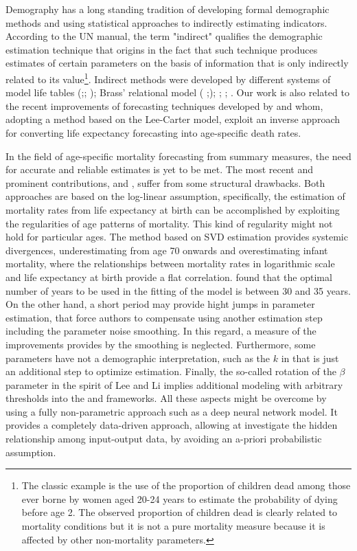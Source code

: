 \documentclass[a4,11pt]{article}
\begin{document}
Demography has a long standing tradition of developing formal demographic methods and using statistical approaches to indirectly estimating indicators. According to the UN manual, the term "indirect" qualifies the demographic estimation technique that origins in the fact that such technique produces estimates of certain parameters on the basis of information that is only indirectly related to its value\footnote{The classic example is the use of the proportion of children dead among those ever borne by women aged 20-24 years to estimate the probability of dying before age 2. The observed proportion of children dead is clearly related to mortality conditions but it is not a pure mortality measure because it is affected by other non-mortality parameters.}. 
Indirect methods were developed by different systems of model life tables (\cite{UN_1955};\cite{UN_1967}; \cite{sullivan1972}); Brass’ relational model ( \cite{brass1968};\cite{brass1971}); \cite{murray2003};  \cite{wilmoth2012}; \cite{mayhew2013}.
Our work is also related to the recent improvements of forecasting techniques developed by \cite{Sevcikova} and  \cite{PascariuLL} whom, adopting a method based on the Lee-Carter model, exploit an inverse approach for converting life expectancy forecasting into age-specific death rates.

In the field of age-specific mortality forecasting from summary measures, the need for accurate and reliable estimates is yet to be met. The most recent and prominent contributions, \cite{Sevcikova} and  \cite{PascariuLL}, suffer from some structural drawbacks. Both approaches are based on the log-linear assumption, specifically, the estimation of mortality rates from life expectancy at birth can be accomplished by exploiting the regularities of age patterns of mortality. This kind of regularity might not hold for particular ages. The \cite{PascariuLL} method based on SVD estimation provides systemic divergences, underestimating from age 70 onwards and overestimating infant mortality, where the relationships between mortality rates in logarithmic scale and life expectancy at birth provide a flat correlation. 
\cite{PascariuLL} found that the optimal number of years to be used in the fitting of the model is between 30 and 35 years. On the other hand, a short period may provide hight jumps in parameter estimation, that force authors to compensate using another estimation step including the parameter noise smoothing. In this regard, a measure of the improvements provides by the smoothing is neglected.
Furthermore, some parameters have not a demographic interpretation, such as the $k$ in \cite{PascariuLL} that is just an additional step to optimize estimation. Finally, the so-called rotation of the $\beta$ parameter in the spirit of Lee and Li implies additional modeling with arbitrary thresholds into the \cite{Sevcikova} and \cite{PascariuLL} frameworks.
All these aspects might be overcome by using a fully non-parametric approach such as a deep neural network model. It provides a completely data-driven approach, allowing at investigate the hidden relationship among input-output data, by avoiding an a-priori probabilistic assumption.
\end{document}
